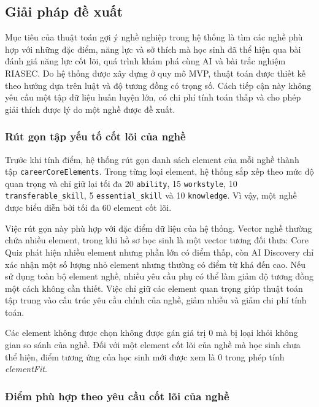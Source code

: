 \subsection{Giải pháp đề xuất}
\label{subsection:5.5.2}

Mục tiêu của thuật toán gợi ý nghề nghiệp trong hệ thống là tìm các nghề phù hợp với những đặc điểm, năng lực và sở thích mà học sinh đã thể hiện qua bài đánh giá năng lực cốt lõi, quá trình khám phá cùng AI và bài trắc nghiệm RIASEC. Do hệ thống được xây dựng ở quy mô MVP, thuật toán được thiết kế theo hướng dựa trên luật và độ tương đồng có trọng số. Cách tiếp cận này không yêu cầu một tập dữ liệu huấn luyện lớn, có chi phí tính toán thấp và cho phép giải thích được lý do một nghề được đề xuất.

\subsubsection{Rút gọn tập yếu tố cốt lõi của nghề}

Trước khi tính điểm, hệ thống rút gọn danh sách element của mỗi nghề thành tập \texttt{careerCoreElements}. Trong từng loại element, hệ thống sắp xếp theo mức độ quan trọng và chỉ giữ lại tối đa 20 \texttt{ability}, 15 \texttt{workstyle}, 10 \texttt{transferable\_skill}, 5 \texttt{essential\_skill} và 10 \texttt{knowledge}. Vì vậy, một nghề được biểu diễn bởi tối đa 60 element cốt lõi.

Việc rút gọn này phù hợp với đặc điểm dữ liệu của hệ thống. Vector nghề thường chứa nhiều element, trong khi hồ sơ học sinh là một vector tương đối thưa: Core Quiz phát hiện nhiều element nhưng phần lớn có điểm thấp, còn AI Discovery chỉ xác nhận một số lượng nhỏ element nhưng thường có điểm từ khá đến cao. Nếu sử dụng toàn bộ element nghề, nhiều yêu cầu phụ có thể làm giảm độ tương đồng một cách không cần thiết. Việc chỉ giữ các element quan trọng giúp thuật toán tập trung vào cấu trúc yêu cầu chính của nghề, giảm nhiễu và giảm chi phí tính toán.

Các element không được chọn không được gán giá trị 0 mà bị loại khỏi không gian so sánh của nghề. Đối với một element cốt lõi của nghề mà học sinh chưa thể hiện, điểm tương ứng của học sinh mới được xem là 0 trong phép tính \textit{elementFit}.

\subsubsection{Điểm phù hợp theo yêu cầu cốt lõi của nghề}

